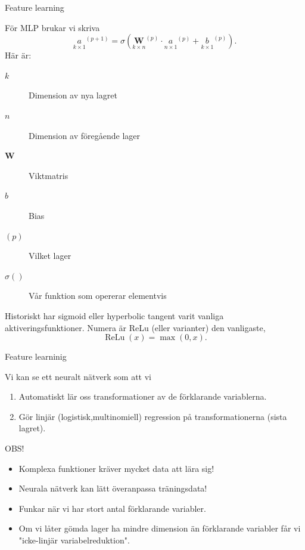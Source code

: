 \documentclass[10pt,english]{beamer}
\begin{document}
\begin{frame}{Feature learning}
    
    För MLP brukar vi skriva
    \begin{equation*}
        \underset{k \times 1}{a}^{(p+1)} = \sigma \left( \underset{k \times n}{\mathbf{W}}^{(p)} \cdot \underset{n \times 1}{a}^{(p)} + \underset{k \times 1}{b}^{(p)} \right).
    \end{equation*}
    Här är:
    \begin{description}
        \item[$k$] Dimension av nya lagret
        \item[$n$] Dimension av föregående lager
        \item[$\mathbf{W}$] Viktmatris
        \item[$b$] Bias
        \item[$(p)$] Vilket lager
        \item[$\sigma()$] Vår funktion som opererar elementvis   
    \end{description}
    Historiskt har sigmoid eller hyperbolic tangent varit vanliga aktiveringsfunktioner. Numera är ReLu (eller varianter) den vanligaste,
    \begin{equation*}
        \operatorname{ReLu}(x) = \max(0,x).
    \end{equation*}
\end{frame}

\begin{frame}{Feature learninig}

    Vi kan se ett neuralt nätverk som att vi
    \begin{enumerate}
        \item Automatiskt lär oss transformationer av de förklarande variablerna.
        \item Gör linjär (logistisk,multinomiell) regression på transformationerna (sista lagret).
    \end{enumerate}
    OBS!
    \begin{itemize}
        \item Komplexa funktioner kräver mycket data att lära sig!
        \item Neurala nätverk kan lätt överanpassa träningsdata!
        \item Funkar när vi har stort antal förklarande variabler.
        \item Om vi låter gömda lager ha mindre dimension än förklarande variabler får vi "icke-linjär variabelreduktion".
    \end{itemize}
    
\end{frame}
\end{document}
